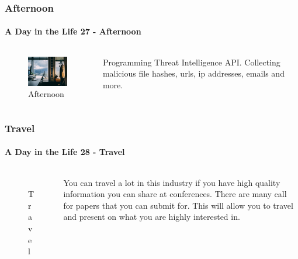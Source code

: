 \documentclass[aspectratio=169]{beamer}
\begin{document}
\begin{frame}
  \frametitle{Afternoon}
  \framesubtitle{A Day in the Life 27 - Afternoon}
  \begin{columns}[onlytextwidth]
    \begin{column}{.30\textwidth}
      \begin{figure}
        \includegraphics[width=5.5cm,keepaspectratio]{afternoon}
        \caption{Afternoon}
      \end{figure}
    \end{column}
    \hfill
    \begin{column}{.60\textwidth}
        \begin{tcolorbox}[title=programming.log,colback=gray]
         Programming Threat Intelligence API. Collecting malicious file hashes, urls, ip addresses, emails and more. 
        \end{tcolorbox}
    \end{column}
  \end{columns}
\end{frame}

\begin{frame}
  \frametitle{Travel}
  \framesubtitle{A Day in the Life 28 - Travel}
  \begin{columns}[onlytextwidth]
    \begin{column}{.30\textwidth}
      \begin{figure}
        \includegraphics[width=5.5cm,keepaspectratio]{travel}
        \caption{Travel}
      \end{figure}
    \end{column}
    \hfill
    \begin{column}{.60\textwidth}
        \begin{tcolorbox}[title=travel.log,colback=gray]
          You can travel a lot in this industry if you have high quality information you can share at conferences. There are many call for papers that you can submit for. This will allow you to travel and present on what you are highly interested in.
        \end{tcolorbox}
    \end{column}
  \end{columns}
\end{frame}
\end{document}
